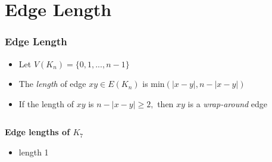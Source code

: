 \documentclass[11pt,serif,professionalfont,aspectratio=169]{beamer}
\newcommand{\vertex}{\node[vertex]}
\theoremstyle{plain}
\begin{document}
\section{Edge Length}
\begin{frame}
\frametitle{Edge Length}
\begin{itemize}
\item Let $V(K_n)=\{0,1,...,n-1\}$ 
\pause
\item The \emph{length} of edge $xy \in E(K_n)$ is min$(|x-y|,n-|x-y|)$
\pause
\item If the length of $xy$ is $n-|x-y|\geq 2,$ then $xy$ is a \emph{wrap-around} edge
\end{itemize}
\hrulefill %
\pause
\begin{columns}[T] %
\begin{column}{.48\textwidth}
\textbf{Edge lengths of $K_7$} \newline
\begin{itemize}
\item \color{black} length 1 \newline
\end{itemize}
\end{column}%
\hfill%
\begin{column}{.48\textwidth}
\begin{center}
\end{center}
\end{column}%
\end{columns}


\end{frame}
\end{document}
